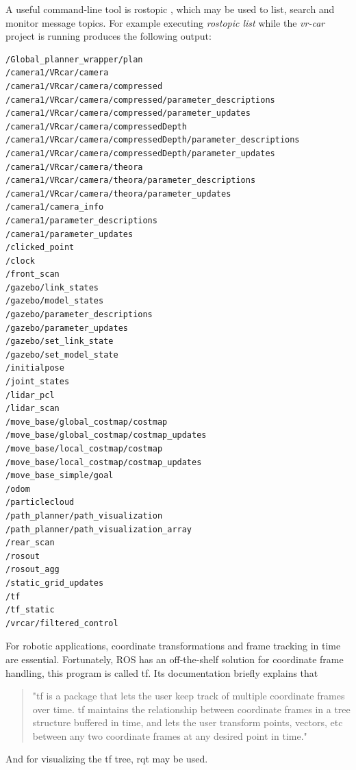 A useful command-line tool is rostopic \cite{ros_rostopic}, which may be used to list, search and monitor message topics. For example executing \textit{rostopic list} while the \textit{vr-car} project is running produces the following output:

\begin{minipage}{\textwidth}
\begin{lstlisting}[language=bash]
/Global_planner_wrapper/plan
/camera1/VRcar/camera
/camera1/VRcar/camera/compressed
/camera1/VRcar/camera/compressed/parameter_descriptions
/camera1/VRcar/camera/compressed/parameter_updates
/camera1/VRcar/camera/compressedDepth
/camera1/VRcar/camera/compressedDepth/parameter_descriptions
/camera1/VRcar/camera/compressedDepth/parameter_updates
/camera1/VRcar/camera/theora
/camera1/VRcar/camera/theora/parameter_descriptions
/camera1/VRcar/camera/theora/parameter_updates
/camera1/camera_info
/camera1/parameter_descriptions
/camera1/parameter_updates
/clicked_point
/clock
/front_scan
/gazebo/link_states
/gazebo/model_states
/gazebo/parameter_descriptions
/gazebo/parameter_updates
/gazebo/set_link_state
/gazebo/set_model_state
/initialpose
/joint_states
/lidar_pcl
/lidar_scan
/move_base/global_costmap/costmap
/move_base/global_costmap/costmap_updates
/move_base/local_costmap/costmap
/move_base/local_costmap/costmap_updates
/move_base_simple/goal
/odom
/particlecloud
/path_planner/path_visualization
/path_planner/path_visualization_array
/rear_scan
/rosout
/rosout_agg
/static_grid_updates
/tf
/tf_static
/vrcar/filtered_control
\end{lstlisting}
\end{minipage}

For robotic applications, coordinate transformations and frame tracking in time are essential. Fortunately, ROS has an off-the-shelf solution for coordinate frame handling, this program is called tf. Its documentation \cite{ros_tf} briefly explains that

\begin{quote}
"tf is a package that lets the user keep track of multiple coordinate frames over time. tf maintains the relationship between coordinate frames in a tree structure buffered in time, and lets the user transform points, vectors, etc between any two coordinate frames at any desired point in time."
\end{quote}

And for visualizing the tf tree, rqt \cite{ros_rqt} may be used.

